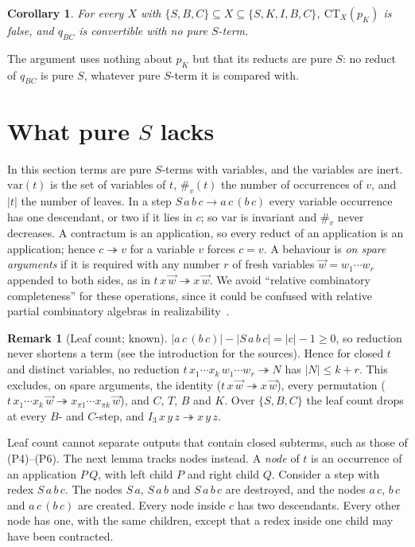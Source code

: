 \documentclass[11pt]{amsart}
\newtheorem{corollary}[theorem]{Corollary}
\theoremstyle{definition}
\newtheorem{remark}[theorem]{Remark}
\newcommand{\red}{\twoheadrightarrow}
\newcommand{\sz}[1]{\lvert#1\rvert}
\newcommand{\CT}{\mathrm{CT}}
\newcommand{\pK}{p_K}
\newcommand{\qBC}{q_{BC}}
\newcommand{\Ir}{I_3}
\newcommand{\var}{\mathrm{var}}
\newcommand{\vw}{\vec w}
\begin{document}
\begin{corollary}
For every $X$ with $\{S,B,C\}\subseteq X\subseteq\{S,K,I,B,C\}$, $\CT_X(\pK)$ is false, and $\qBC$ is
convertible with no pure $S$-term.
\end{corollary}

The argument uses nothing about $\pK$ but that its reducts are pure $S$: no reduct of $\qBC$ is pure
$S$, whatever pure $S$-term it is compared with.

\section{What pure \texorpdfstring{$S$}{S} lacks}\label{sec:pure}

In this section terms are pure $S$-terms with variables, and the variables are inert. $\var(t)$ is the
set of variables of $t$, $\#_v(t)$ the number of occurrences of $v$, and $\sz t$ the number of leaves.
In a step $S\,a\,b\,c\to a\,c\,(b\,c)$ every variable occurrence has one descendant, or two if it lies in
$c$; so $\var$ is invariant and $\#_v$ never decreases. A contractum is an application, so every reduct
of an application is an application; hence $c\red v$ for a variable $v$ forces $c=v$. A behaviour is
\emph{on spare arguments} if it is required with any number $r$ of fresh variables $\vw=w_1\cdots w_r$
appended to both sides, as in $t\,x\,\vw\red x\,\vw$. We avoid ``relative combinatory completeness'' for
these operations, since it could be confused with relative partial combinatory algebras in
realizability~\citep{vanoosten}.

\begin{remark}[Leaf count; known]\label{rem:size}
$\sz{a\,c\,(b\,c)}-\sz{S\,a\,b\,c}=\sz c-1\ge0$, so reduction never shortens a term (see the
introduction for the sources). Hence for closed $t$ and distinct variables, no reduction
$t\,x_1\cdots x_k\,w_1\cdots w_r\red N$ has $\sz N\le k+r$. This excludes, on spare arguments, the
identity ($t\,x\,\vw\red x\,\vw$), every permutation ($t\,x_1\cdots x_k\,\vw\red x_{\pi1}\cdots x_{\pi k}\,\vw$),
and $C$, $T$, $B$ and $K$. Over $\{S,B,C\}$ the leaf count drops at every $B$- and $C$-step, and
$\Ir\,x\,y\,z\red x\,y\,z$.
\end{remark}

Leaf count cannot separate outputs that contain closed subterms, such as those of (P4)--(P6). The next
lemma tracks nodes instead. A \emph{node} of $t$ is an occurrence of an application $P\,Q$, with left
child $P$ and right child $Q$. Consider a step with redex $S\,a\,b\,c$. The nodes $S\,a$, $S\,a\,b$ and
$S\,a\,b\,c$ are destroyed, and the nodes $a\,c$, $b\,c$ and $a\,c\,(b\,c)$ are created. Every node inside
$c$ has two descendants. Every other node has one, with the same children, except that a redex inside
one child may have been contracted.
\end{document}
